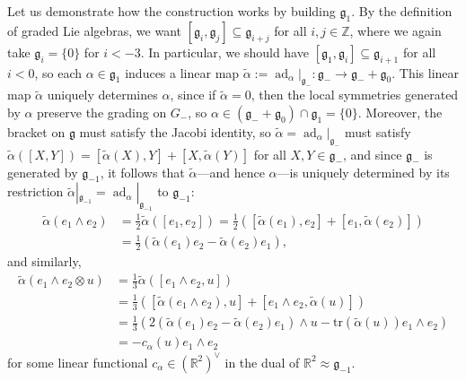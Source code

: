 \documentclass[12pt,a4paper]{amsart}
\theoremstyle{definition}
\DeclareMathOperator{\ad}{ad}
\begin{document}
Let us demonstrate how the construction works by building $\mathfrak{g}_1$. By the definition of graded Lie algebras, we want $[\mathfrak{g}_i,\mathfrak{g}_j]\subseteq\mathfrak{g}_{i+j}$ for all $i,j\in\mathbb{Z}$, where we again take $\mathfrak{g}_i=\{0\}$ for $i<-3$. In particular, we should have $[\mathfrak{g}_1,\mathfrak{g}_i]\subseteq\mathfrak{g}_{i+1}$ for all $i<0$, so each $\alpha\in\mathfrak{g}_1$ induces a linear map $\tilde{\alpha}:=\ad_\alpha|_{\mathfrak{g}_-}:\mathfrak{g}_-\to\mathfrak{g}_-+\mathfrak{g}_0$. This linear map $\tilde{\alpha}$ uniquely determines $\alpha$, since if $\tilde{\alpha}=0$, then the local symmetries generated by $\alpha$ preserve the grading on $G_-$, so ${\alpha\in(\mathfrak{g}_-+\mathfrak{g}_0)\cap\mathfrak{g}_1=\{0\}}$. Moreover, the bracket on $\mathfrak{g}$ must satisfy the Jacobi identity, so $\tilde{\alpha}=\ad_\alpha|_{\mathfrak{g}_-}$ must satisfy $\tilde{\alpha}([X,Y])=[\tilde{\alpha}(X),Y]+[X,\tilde{\alpha}(Y)]$ for all $X,Y\in\mathfrak{g}_-$, and since $\mathfrak{g}_-$ is generated by $\mathfrak{g}_{-1}$, it follows that $\tilde{\alpha}$---and hence $\alpha$---is uniquely determined by its restriction $\tilde{\alpha}|_{\mathfrak{g}_{-1}}=\ad_\alpha|_{\mathfrak{g}_{-1}}$ to $\mathfrak{g}_{-1}$:
\begin{align*}\tilde{\alpha}(e_1\wedge e_2) & =\frac{1}{2}\tilde{\alpha}([e_1,e_2])=\frac{1}{2}([\tilde{\alpha}(e_1),e_2]+[e_1,\tilde{\alpha}(e_2)]) \\ & =\frac{1}{2}(\tilde{\alpha}(e_1)e_2-\tilde{\alpha}(e_2)e_1),\end{align*}
and similarly,
\begin{align*}\tilde{\alpha}(e_1\wedge e_2\otimes u) & =\frac{1}{3}\tilde{\alpha}([e_1\wedge e_2,u]) \\ & =\frac{1}{3}([\tilde{\alpha}(e_1\wedge e_2),u]+[e_1\wedge e_2,\tilde{\alpha}(u)]) \\ & =\frac{1}{3}(2(\tilde{\alpha}(e_1)e_2-\tilde{\alpha}(e_2)e_1)\wedge u-\mathrm{tr}(\tilde{\alpha}(u))e_1\wedge e_2) \\ & =-c_\alpha(u)e_1\wedge e_2\end{align*}
for some linear functional $c_\alpha\in(\mathbb{R}^2)^\vee$ in the dual of $\mathbb{R}^2\approx\mathfrak{g}_{-1}$.
\end{document}
